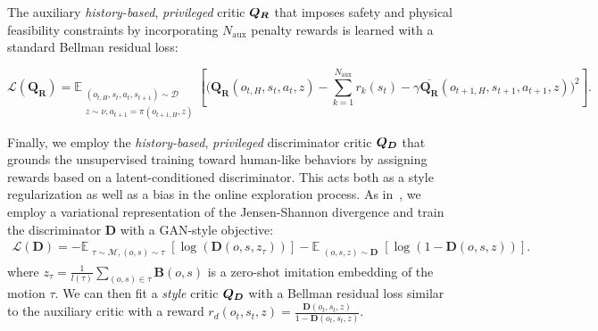 %
The auxiliary \emph{history-based}, \emph{privileged} critic $\boldsymbol{Q_R}$ that imposes safety and physical feasibility constraints by incorporating $N_{\mathrm{aux}}$ penalty rewards is learned with a standard Bellman residual loss:
\begin{small}
\[
\mathcal{L}(\boldsymbol{Q_R})= \mathbb{E}_{\substack{(o_{t, H}, s_t, a_t, s_{t+1}) \sim \mathcal{D}\\ z\sim\nu, a_{t+1}=\pi(o_{t+1, H}, z)}} \left[ \Big(\boldsymbol{Q_R}(o_{t, H}, s_t, a_t, z) - \sum_{k=1}^{N_{\mathrm{aux}}} r_k(s_t) - \gamma \overline{\boldsymbol{Q_R}}(o_{t+1, H},s_{t+1}, a_{t+1}, z)\Big)^2\right].
\]
\end{small}
Finally, we employ the \emph{history-based}, \emph{privileged} discriminator critic $\boldsymbol{Q_D}$ that grounds the unsupervised training toward human-like behaviors by assigning rewards based on a latent-conditioned discriminator. This acts both as a style regularization as well as a bias in the online exploration process. 
As in~\citep{TirinzoniTFGKXL25zeroshot}, we employ a variational representation of the Jensen-Shannon divergence and train the discriminator $\boldsymbol{D}$ with a GAN-style objective:
\begin{align*}\label{eq:disc-loss}
    \mathcal{L}(\boldsymbol{D}) = 
    -\mathbb{E}_{\substack{\tau \sim \mathcal{M}, (o, s) \sim \tau }} \left[ \log(\boldsymbol{D}(o, s, z_\tau))\right] -\mathbb{E}_{\substack{(o, s, z) \sim \mathcal{\boldsymbol{D}}}} \left[\log(1 - \boldsymbol{D}(o, s, z))\right].
\end{align*}
where $z_\tau=\frac{1}{l(\tau)} \sum_{(o,s) \in \tau} \boldsymbol{B}(o,s)$ is a zero-shot imitation embedding of the motion $\tau$. We can then fit a \emph{style} critic $\boldsymbol{Q_D}$ with a Bellman residual loss similar to the auxiliary critic with a reward $r_d(o_t,s_t,z)=\frac{\boldsymbol{D}(o_t,s_t,z)}{1-\boldsymbol{D}(o_t,s_t,z)}$.
